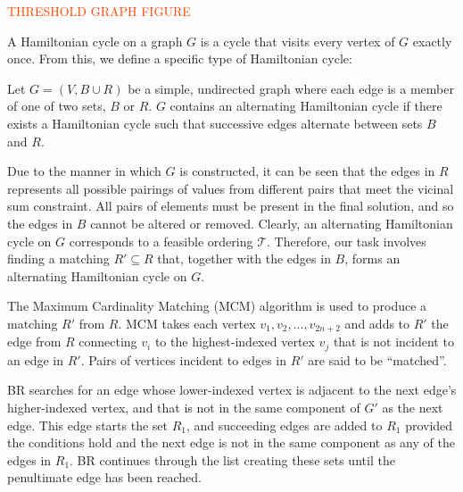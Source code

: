 \documentclass{elsarticle}
\begin{document}
\textcolor{OrangeRed}{THRESHOLD GRAPH FIGURE}

A Hamiltonian cycle on a graph $G$ is a cycle that visits every vertex of $G$ exactly once. From this, we define a specific type of Hamiltonian cycle:

\begin{definition}
	\label{defn:althamcycle}
	Let $G = (V, B \cup R)$ be a simple, undirected graph where each edge is a member of one of two sets, $B$ or $R$. $G$ contains an alternating Hamiltonian cycle if there exists a Hamiltonian cycle such that successive edges alternate between sets $B$ and $R$.
\end{definition}

Due to the manner in which $G$ is constructed, it can be seen that the edges in $R$ represents all possible pairings of values from different pairs that meet the vicinal sum constraint. All pairs of elements must be present in the final solution, and so the edges in $B$ cannot be altered or removed. Clearly, an alternating Hamiltonian cycle on $G$ corresponds to a feasible ordering $\mathcal{T}$. Therefore, our task involves finding a matching $R' \subseteq R$ that, together with the edges in $B$, forms an alternating Hamiltonian cycle on $G$.

The Maximum Cardinality Matching (MCM) algorithm is used to produce a matching $R'$ from $R$. MCM takes each vertex $v_1, v_2,...,v_{2n+2}$ and adds to $R'$ the edge from $R$ connecting $v_i$ to the highest-indexed vertex $v_j$ that is not incident to an edge in $R'$. Pairs of vertices incident to edges in $R'$ are said to be ``matched''.

BR searches for an edge whose lower-indexed vertex is adjacent to the next edge's higher-indexed vertex, and that is not in the same component of $G'$ as the next edge. This edge starts the set $R_1$, and succeeding edges are added to $R_1$ provided the conditions hold and the next edge is not in the same component as any of the edges in $R_1$. BR continues through the list creating these sets until the penultimate edge has been reached. 
\end{document}
